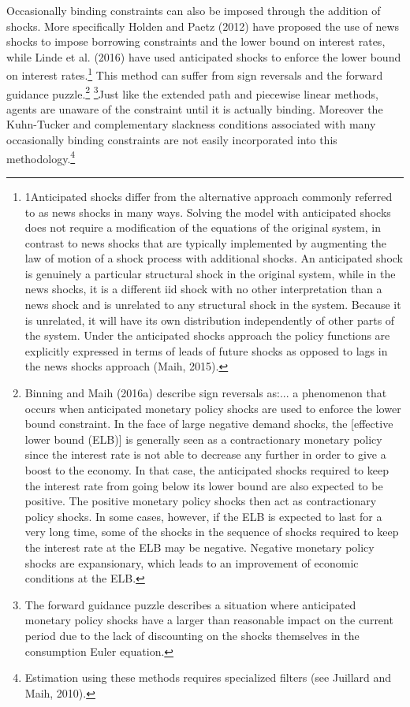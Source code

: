 \documentclass[cn,10pt,math=newtx,citestyle=gb7714-2015,bibstyle=gb7714-2015]{elegantbook}
\begin{document}
Occasionally binding constraints can also be imposed through the addition of shocks. More specifically Holden and Paetz (2012) have proposed the use of news shocks to impose borrowing constraints and the lower bound on interest rates, while Linde et al. (2016) have used anticipated shocks to enforce the lower bound on interest rates.\footnote{1Anticipated shocks differ from the alternative approach commonly referred to as news shocks in many ways. Solving the model with anticipated shocks does not require a modification of the equations of the original system, in contrast to news shocks that are typically implemented by augmenting the law of motion of a shock process with additional shocks. An anticipated shock is genuinely a particular structural shock in the original system, while in the news shocks, it is a different iid shock with no other interpretation than a news shock and is unrelated to any structural shock in the system. Because it is unrelated, it will have its
	own distribution independently of other parts of the system. Under the anticipated shocks approach the policy functions are explicitly expressed in terms of leads of future shocks as opposed to lags in the news shocks approach (Maih, 2015).} This method can suffer from sign reversals and the forward guidance puzzle.\footnote{Binning and Maih (2016a) describe sign reversals as:... a phenomenon that occurs when anticipated monetary policy shocks are used to enforce the lower bound constraint. In the face of large negative demand shocks, the [effective lower bound (ELB)] is generally seen as a contractionary monetary policy since the interest rate is not able to decrease any further in order to give a boost to the economy. In that case, the anticipated shocks required to keep the interest rate from going below its lower bound are also expected to be positive. The positive monetary policy shocks then act as contractionary policy shocks. In some cases, however, if the ELB is expected to last for a very long time, some of the shocks in the sequence of shocks required to keep the interest rate at the ELB may be
	negative. Negative monetary policy shocks are expansionary, which leads to an improvement of economic conditions at the ELB.} \footnote{The forward guidance puzzle describes a situation where anticipated monetary policy shocks have a larger than reasonable impact on the current period due to the lack of discounting on the shocks themselves in the consumption Euler equation.}Just like the extended path and piecewise linear methods, agents are unaware of the constraint until it is actually binding. Moreover the Kuhn-Tucker and complementary slackness conditions associated with many occasionally binding constraints are not easily incorporated into this methodology.\footnote{Estimation using these methods requires specialized filters (see Juillard and Maih, 2010).}
\end{document}

